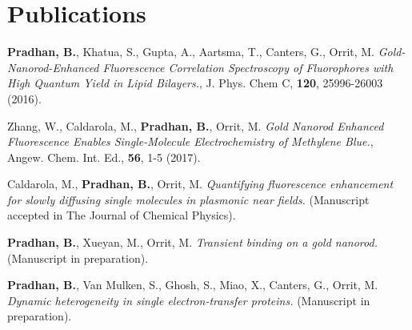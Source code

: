 \chapter*{Publications}
\label{ch:Publications}

\begin{enumerate}{%

	\item \textbf{Pradhan, B.}, Khatua, S., Gupta, A., Aartsma, T., Canters, G., Orrit, M. \textit{Gold-Nanorod-Enhanced Fluorescence Correlation Spectroscopy of Fluorophores with High Quantum Yield in Lipid Bilayers.}, J. Phys. Chem C, \textbf{120}, 25996-26003 (2016).
	
	\item Zhang, W., Caldarola, M., \textbf{Pradhan, B.}, Orrit, M. \textit{Gold Nanorod Enhanced Fluorescence Enables Single-Molecule Electrochemistry of Methylene Blue.}, Angew. Chem. Int. Ed., \textbf{56}, 1-5 (2017).

	\item Caldarola, M., \textbf{Pradhan, B.}, Orrit, M. \textit{Quantifying fluorescence enhancement for slowly diffusing single molecules in plasmonic near fields.} (Manuscript accepted in The Journal of Chemical Physics).

	\item \textbf{Pradhan, B.}, Xueyan, M., Orrit, M. \textit{Transient binding on a gold nanorod.} (Manuscript in preparation).

	\item \textbf{Pradhan, B.}, Van Mulken, S., Ghosh, S., Miao, X., Canters, G., Orrit, M. \textit{Dynamic heterogeneity in single electron-transfer proteins.} (Manuscript in preparation).


}\end{enumerate}